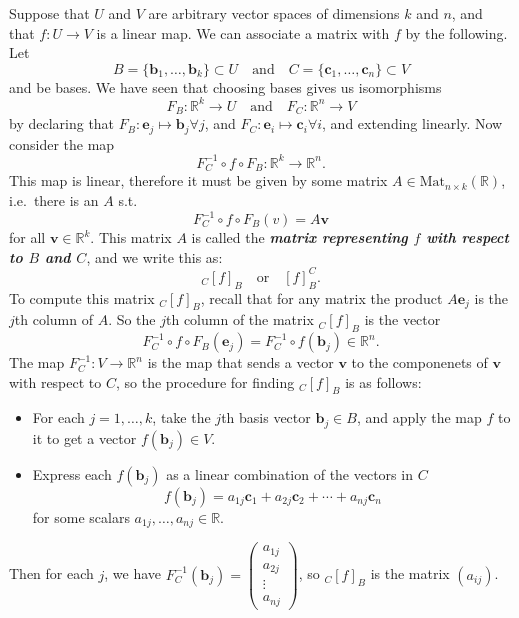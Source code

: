\documentclass[12pt]{report}
\theoremstyle{definition}
\begin{document}
Suppose that $U$ and $V$ are arbitrary vector spaces of dimensions $k$ and $n$,
and that $f:U\rightarrow V$ is a linear map.
We can associate a matrix with $f$ by the following. Let \[
    B = \{\mathbf{b}_1,\ldots,\mathbf{b}_k\}\subset U
    \quad\text{and}\quad
    C=\{\mathbf{c}_1,\ldots,\mathbf{c}_n\}\subset V
\]and be bases.
We have seen that choosing bases gives us isomorphisms\[
    F_B : \mathbb{R}^{k}\rightarrow U
    \quad\text{and}\quad
    F_C : \mathbb{R}^{n}\rightarrow V
\]by declaring that $F_B:\mathbf{e}_j\mapsto\mathbf{b}_j\forall j$,
and $F_C:\mathbf{e}_i\mapsto\mathbf{c}_i\forall i$,
and extending linearly. Now consider the map\[
    F_C^{-1}\circ f \circ F_B : \mathbb{R}^{k}\rightarrow\mathbb{R}^{n}.
\]This map is linear, therefore it must be given by some matrix
$A\in \text{Mat}_{n\times k}(\mathbb{R})$, i.e.\ there is an $A$ s.t.\[
    F_C^{-1}\circ f \circ F_B(v) = A\mathbf{v}
\]for all $\mathbf{v}\in\mathbb{R}^{k}$. This matrix $A$ is called
the \textbf{\emph{matrix representing $f$ with respect to $B$ and $C$}},
and we write this as:\[
    {}_{C}{[f]}_B \quad\text{or}\quad {[f]}_B^{C}.
\]
To compute this matrix ${}_C{[f]}_{B}$, recall that for any matrix
the product $A\mathbf{e}_j$ is the $j$th column of $A$.
So the $j$th column of the matrix ${}_C{[f]}_{B}$ is the vector\[
    F_C^{-1}\circ f \circ F_B(\mathbf{e}_j) 
    = F_C^{-1} \circ f(\mathbf{b}_j)\in\mathbb{R}^{n}.
\]The map $F_C^{-1}:V\rightarrow\mathbb{R}^{n}$ is the map that
sends a vector $\mathbf{v}$ to the componenets of $\mathbf{v}$
with respect to $C$, so the procedure for finding ${}_C{[f]}_{B}$
is as follows:
\begin{itemize}
        \item For each $j = 1,\ldots,k$, take the $j$th basis vector 
            $\mathbf{b}_j\in B$, and apply the map $f$ to it
            to get a vector $f(\mathbf{b}_j)\in V$.
        \item Express each $f(\mathbf{b}_j)$ as a linear combination
            of the vectors in $C$\[
                f(\mathbf{b}_j) = a_{1j}\mathbf{c}_1
                + a_{2j}\mathbf{c}_2 + \cdots + a_{nj}\mathbf{c}_n
            \]for some scalars $a_{1j},\ldots,a_{nj}\in\mathbb{R}$.
\end{itemize} 
Then for each $j$, we have $F_C^{-1}(\mathbf{b}_j) = \begin{pmatrix}
        a_{1j} \\
        a_{2j} \\
        \vdots \\
        a_{nj}
    \end{pmatrix}$, so ${}_C{[f]}_{B}$ is the matrix $(a_{ij})$.
\end{document}
